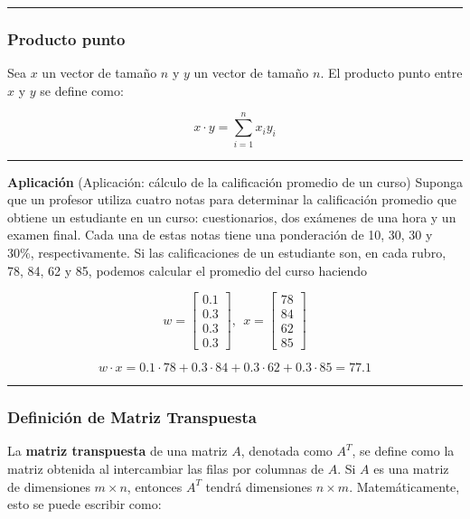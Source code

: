 \documentclass[
  letterpaper,
  DIV=11,
  numbers=noendperiod]{scrartcl}
\begin{document}
\begin{center}\rule{0.5\linewidth}{0.5pt}\end{center}

\subsubsection{Producto punto}\label{producto-punto}

Sea \(x\) un vector de tamaño \(n\) y \(y\) un vector de tamaño \(n\).
El producto punto entre \(x\) y \(y\) se define como:

\[ x \cdot y = \sum_{i=1}^n x_i y_i \]

\begin{center}\rule{0.5\linewidth}{0.5pt}\end{center}

\textbf{Aplicación} (Aplicación: cálculo de la calificación promedio de
un curso) Suponga que un profesor utiliza cuatro notas para determinar
la calificación promedio que obtiene un estudiante en un curso:
cuestionarios, dos exámenes de una hora y un examen final. Cada una de
estas notas tiene una ponderación de 10, 30, 30 y 30\%, respectivamente.
Si las calificaciones de un estudiante son, en cada rubro, 78, 84, 62 y
85, podemos calcular el promedio del curso haciendo

\[w=\begin{bmatrix}0.1 \\ 0.3 \\ 0.3 \\ 0.3\end{bmatrix},\ \ x=\begin{bmatrix}78 \\ 84 \\ 62 \\ 85\end{bmatrix}\]

\[w \cdot x = 0.1 \cdot 78 + 0.3 \cdot 84 + 0.3 \cdot 62 + 0.3 \cdot 85 = 77.1\]

\begin{center}\rule{0.5\linewidth}{0.5pt}\end{center}

\subsubsection{Definición de Matriz
Transpuesta}\label{definiciuxf3n-de-matriz-transpuesta}

La \textbf{matriz transpuesta} de una matriz \(A\), denotada como
\(A^T\), se define como la matriz obtenida al intercambiar las filas por
columnas de \(A\). Si \(A\) es una matriz de dimensiones \(m \times n\),
entonces \(A^T\) tendrá dimensiones \(n \times m\). Matemáticamente,
esto se puede escribir como:
\end{document}
